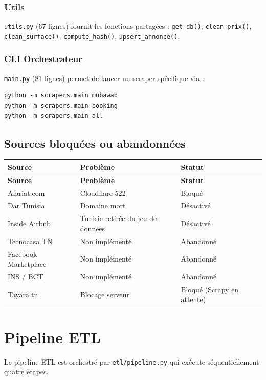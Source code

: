 \documentclass[12pt,a4paper]{report}
\begin{document}
\subsection{Utils}
\texttt{utils.py} (67 lignes) fournit les fonctions partagées : \texttt{get\_db()}, \texttt{clean\_prix()}, \texttt{clean\_surface()}, \texttt{compute\_hash()}, \texttt{upsert\_annonce()}.

\subsection{CLI Orchestrateur}
\texttt{main.py} (81 lignes) permet de lancer un scraper spécifique via :
\begin{verbatim}
python -m scrapers.main mubawab
python -m scrapers.main booking
python -m scrapers.main all
\end{verbatim}

\section{Sources bloquées ou abandonnées}

\begin{longtable}{lll}
\toprule
\textbf{Source} & \textbf{Problème} & \textbf{Statut} \\
\midrule
\endfirsthead
\toprule
\textbf{Source} & \textbf{Problème} & \textbf{Statut} \\
\midrule
\endhead
\bottomrule
\endfoot
Afariat.com & Cloudflare 522 & Bloqué \\
Dar Tunisia & Domaine mort & Désactivé \\
Inside Airbnb & Tunisie retirée du jeu de données & Désactivé \\
Tecnocasa TN & Non implémenté & Abandonné \\
Facebook Marketplace & Non implémenté & Abandonné \\
INS / BCT & Non implémenté & Abandonné \\
Tayara.tn & Blocage serveur & Bloqué (Scrapy en attente) \\
\bottomrule
\end{longtable}

\chapter{Pipeline ETL}

Le pipeline ETL est orchestré par \texttt{etl/pipeline.py} qui exécute séquentiellement quatre étapes.
\end{document}

